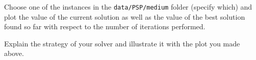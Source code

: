 \documentclass[12pt]{report}
\newcommand{\answerbox}[2]{\hfill\break\\
        \framebox[\linewidth]{\parbox[c][#1][c]{\dimexpr\linewidth-2\fboxsep-2\fboxrule}{#2}}
}
\begin{document}
\begin{Exercise}[title={Analyzing the behavior of your local search solver}]

\Question Choose one of the instances in the \texttt{data/PSP/medium} folder (specify which) and plot the value of the current solution as well as the value of the best solution found so far with respect to the number of iterations performed.
\answerbox{8cm}{
}

\Question Explain the strategy of your solver and illustrate it with the plot you made above.
\answerbox{5cm}{
}

\end{Exercise}
\end{document}
